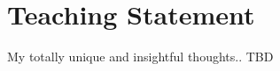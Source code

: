 \pagestyle{plain}
\chapter[Teaching Statement][Teaching Statement]{Teaching Statement}

My totally unique and insightful thoughts.. TBD